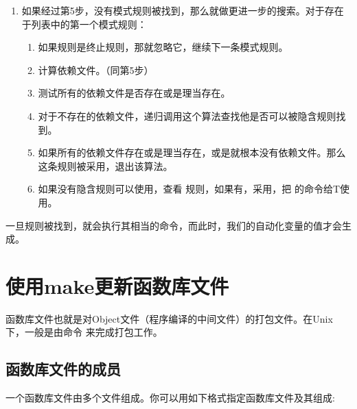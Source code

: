 \documentclass[a4paper,10pt]{sphinxmanual}
\begin{document}
\begin{enumerate}
\item {} 
如果经过第5步，没有模式规则被找到，那么就做更进一步的搜索。对于存在于列表中的第一个模式规则：
\begin{enumerate}
\def\theenumii{\arabic{enumii}}
\def\labelenumii{\theenumii .}
\makeatletter\def\p@enumiii{\p@enumii \theenumii .}\makeatother
\item {} 
如果规则是终止规则，那就忽略它，继续下一条模式规则。

\item {} 
计算依赖文件。（同第5步）

\item {} 
测试所有的依赖文件是否存在或是理当存在。

\item {} 
对于不存在的依赖文件，递归调用这个算法查找他是否可以被隐含规则找到。

\item {} 
如果所有的依赖文件存在或是理当存在，或是就根本没有依赖文件。那么这条规则被采用，退出该算法。

\item {} 
如果没有隐含规则可以使用，查看  规则，如果有，采用，把  的命令给T使用。

\end{enumerate}

\end{enumerate}

一旦规则被找到，就会执行其相当的命令，而此时，我们的自动化变量的值才会生成。


\chapter{使用make更新函数库文件}
\label{\detokenize{archives:make}}\label{\detokenize{archives::doc}}
函数库文件也就是对Object文件（程序编译的中间文件）的打包文件。在Unix下，一般是由命令  来完成打包工作。


\section{函数库文件的成员}
\label{\detokenize{archives:id1}}
一个函数库文件由多个文件组成。你可以用如下格式指定函数库文件及其组成:

\begin{sphinxVerbatim}[commandchars=\\\{\}]
\end{sphinxVerbatim}
\end{document}
